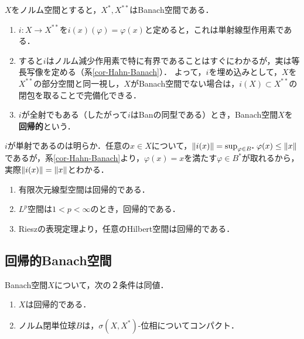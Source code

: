 \documentclass[uplatex,dvipdfmx]{jsreport}
\begin{document}
\begin{definition}
    $X$をノルム空間とすると，$X^*,X^{**}$はBanach空間である．
    \begin{enumerate}
        \item $i:X\to X^{**}$を$i(x)(\varphi)=\varphi(x)$と定めると，これは単射線型作用素である．
        \item すると$i$はノルム減少作用素で特に有界であることはすぐにわかるが，実は等長写像を定める（系\ref{cor-Hahn-Banach}）．
        よって，$i$を埋め込みとして，$X$を$X^{**}$の部分空間と同一視し，$X$がBanach空間でない場合は，$i(X)\subset X^{**}$の閉包を取ることで完備化できる．
        \item $i$が全射でもある（したがって$i$はBanの同型である）とき，Banach空間$X$を\textbf{回帰的}という．
    \end{enumerate}
\end{definition}
\begin{Proof}
    $i$が単射であるのは明らか．任意の$x\in X$について，$\|i(x)\|=\sup_{\varphi\in B^*}\varphi(x)\le\|x\|$であるが，系\ref{cor-Hahn-Banach}より，$\varphi(x)=x$を満たす$\varphi\in B^*$が取れるから，実際$\|i(x)\|=\|x\|$とわかる．
\end{Proof}
\begin{example}\mbox{}
    \begin{enumerate}
        \item 有限次元線型空間は回帰的である．
        \item $L^p$空間は$1<p<\infty$のとき，回帰的である．
        \item Rieszの表現定理より，任意のHilbert空間は回帰的である．
    \end{enumerate}
\end{example}

\subsection{回帰的Banach空間}

\begin{theorem}\label{thm-characterization-of-reflexive-Banach-spaces}
    Banach空間$X$について，次の２条件は同値．
    \begin{enumerate}
        \item $X$は回帰的である．
        \item ノルム閉単位球$B$は，$\sigma(X,X^*)$-位相についてコンパクト．
    \end{enumerate}
\end{theorem}
\end{document}
